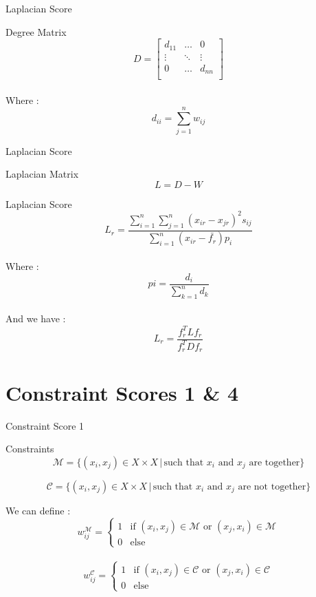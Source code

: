 \documentclass{beamer}
\begin{document}
\begin{frame}{Laplacian Score}

    \begin{block}{Degree Matrix}
        \[ D = \begin{bmatrix}
            d_{11} & \dots & 0 \\
            \vdots & \ddots & \vdots \\
            0 & \dots & d_{nn} \\
        \end{bmatrix} \]
        \\
        Where : \[ d_{ii} = \sum_{j=1}^n w_{ij} \]
    \end{block}
\end{frame}

\begin{frame}{Laplacian Score}
\begin{block}{Laplacian Matrix}
    \[ L = D - W \]
\end{block}

\begin{block}{Laplacian Score}
    \[
L_r = \frac{\sum_{i=1}^{n} \sum_{j=1}^{n} (x_{ir} - x_{jr})^2 s_{ij}}{\sum_{i=1}^{n} (x_{ir} - \bar{f_{r}}) p_{i}}
\]
\\ Where :  \[ pi = \frac{d_i}{\sum_{k=1}^{n}{d_k}} \]
\\ And we have :
    \[ L_r = \frac{f_r^T L f_r}{f_r^T D f_r} \]
\end{block}
\end{frame}

\section{Constraint Scores 1 \& 4}
\begin{frame}{Constraint Score 1}
    \begin{block}{Constraints}
        \[
\mathcal{M} = \{(x_i, x_j) \in X \times X \,|\, \text{such that } x_i \text{ and } x_j \text{ are together}\}
\]

\[
\mathcal{C} = \{(x_i, x_j) \in X \times X \,|\, \text{such that } x_i \text{ and } x_j \text{ are not together}\}
\]
    \end{block}

\begin{block}{We can define :}
    \[
w_{ij}^{\mathcal{M}} =
\begin{cases}
  1 & \text{if } (x_i, x_j) \in \mathcal{M} \text{ or } (x_j, x_i) \in \mathcal{M}\\
  0 & \text{else}
\end{cases}
\]
\\

\[
w_{ij}^{\mathcal{C}} =
\begin{cases}
  1 & \text{if } (x_i, x_j) \in \mathcal{C} \text{ or } (x_j, x_i) \in \mathcal{C} \\
  0 & \text{else}
\end{cases}
\]

\end{block}

\end{frame}
\end{document}
